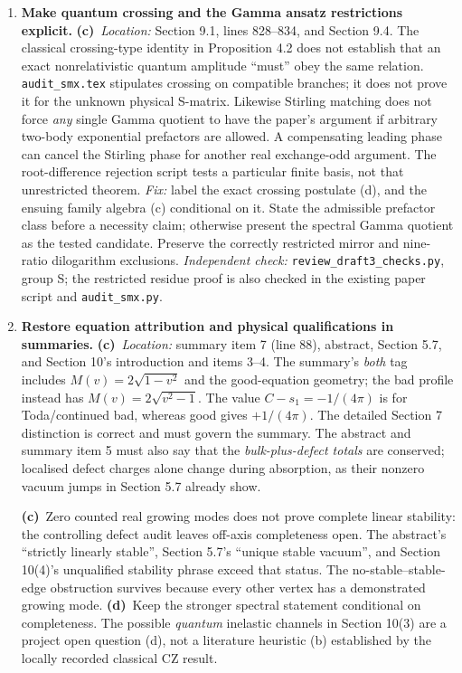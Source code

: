 \documentclass[11pt,a4paper]{article}
\newcommand{\C}{\textbf{(c)}\ }
\newcommand{\D}{\textbf{(d)}\ }
\newcommand{\file}[1]{\nolinkurl{#1}}
\newcommand{\test}[1]{\textit{Independent check:} \file{review_draft3_checks.py}, group #1.}
\begin{document}
\begin{enumerate}[label=\textbf{R\arabic*.},leftmargin=*,itemsep=1.2em]
\item \textbf{Make quantum crossing and the Gamma ansatz restrictions explicit.}
\C \textit{Location:} Section 9.1, lines 828--834, and Section 9.4.
The classical crossing-type identity in Proposition 4.2 does not establish
that an exact nonrelativistic quantum amplitude ``must'' obey the same
relation. \file{audit_smx.tex} stipulates crossing on compatible branches;
it does not prove it for the unknown physical S-matrix.
Likewise Stirling matching does not force \emph{any} single Gamma quotient
to have the paper's argument if arbitrary two-body exponential prefactors
are allowed. A compensating leading phase can cancel the Stirling phase
for another real exchange-odd argument. The root-difference rejection
script tests a particular finite basis, not that unrestricted theorem.
\textit{Fix:} label the exact crossing postulate (d), and the ensuing
family algebra (c) conditional on it. State the admissible prefactor class
before a necessity claim; otherwise present the spectral Gamma quotient
as the tested candidate. Preserve the correctly restricted mirror and
nine-ratio dilogarithm exclusions. \test{S; the restricted residue proof
is also checked in the existing paper script and \file{audit_smx.py}}

\item \textbf{Restore equation attribution and physical qualifications in summaries.}
\C \textit{Location:} summary item 7 (line 88), abstract, Section 5.7,
and Section 10's introduction and items 3--4.
The summary's \emph{both} tag includes $M(v)=2\sqrt{1-v^2}$ and the
good-equation geometry; the bad profile instead has
$M(v)=2\sqrt{v^2-1}$. The value $C-s_1=-1/(4\pi)$ is for Toda/continued
bad, whereas good gives $+1/(4\pi)$. The detailed Section 7 distinction
is correct and must govern the summary. The abstract and summary item 5
must also say that the \emph{bulk-plus-defect totals} are conserved;
localised defect charges alone change during absorption, as their nonzero
vacuum jumps in Section 5.7 already show.

\C Zero counted real growing modes does not prove complete linear
stability: the controlling defect audit leaves off-axis completeness open.
The abstract's ``strictly linearly stable'', Section 5.7's ``unique stable
vacuum'', and Section 10(4)'s unqualified stability phrase exceed that
status. The no-stable--stable-edge obstruction survives because every
other vertex has a demonstrated growing mode.
\D Keep the stronger spectral statement conditional on completeness.
The possible \emph{quantum} inelastic channels in Section 10(3) are a
project open question (d), not a literature heuristic (b) established by
the locally recorded classical CZ result.


\end{enumerate}
\end{document}
